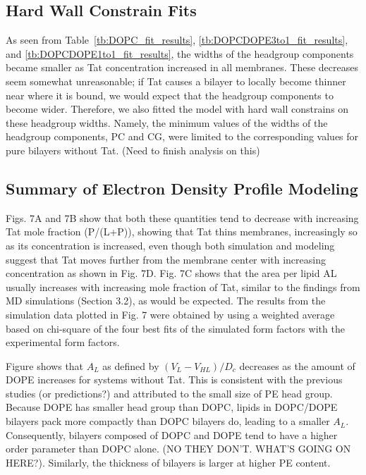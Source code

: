 \subsection{Hard Wall Constrain Fits}
As seen from Table~\ref{tb:DOPC_fit_results}, \ref{tb:DOPCDOPE3to1_fit_results},
and \ref{tb:DOPCDOPE1to1_fit_results}, the widths of the headgroup components
became smaller as Tat concentration increased in all membranes. These 
decreases seem somewhat unreasonable; if Tat causes a bilayer 
to locally become thinner near where it is bound, 
we would expect that the headgroup components to become
wider. Therefore, we also fitted the model with hard wall constrains
on these headgroup widths. Namely, the minimum values of the widths of
the headgroup components, PC and CG, were limited to the corresponding 
values for pure bilayers without Tat. (Need to finish analysis on this)

\subsection{Summary of Electron Density Profile Modeling}
Figs. 7A and 7B show that both these 
quantities tend to
decrease with increasing Tat mole fraction (P/(L+P)), showing that Tat thins 
membranes,
increasingly so as its concentration is increased, even though both simulation 
and modeling
suggest that Tat moves further from the membrane center with increasing 
concentration as
shown in Fig. 7D. Fig. 7C shows that the area per lipid AL usually increases 
with increasing
mole fraction of Tat, similar to the findings from MD simulations (Section 3.2), 
as would be
expected. The results from the simulation data plotted in Fig. 7 were obtained 
by using a
weighted average based on chi-square of the four best fits of the simulated 
form factors with the
experimental form factors.

Figure shows that $A_L$ as defined by $(V_L-V_{HL})/D_c$ decreases as the 
amount of DOPE increases for systems without Tat. This is consistent with the
previous studies (or predictions?) and attributed to the small size of PE
head group. Because DOPE has smaller head group than DOPC, lipids in DOPC/DOPE
bilayers pack more compactly than DOPC bilayers do, leading to a smaller $A_L$.
Consequently, bilayers composed of DOPC and DOPE tend to have a higher order 
parameter than DOPC alone. (NO THEY DON'T. WHAT'S GOING ON HERE?). Similarly,
the thickness of bilayers is larger at higher PE content. 

